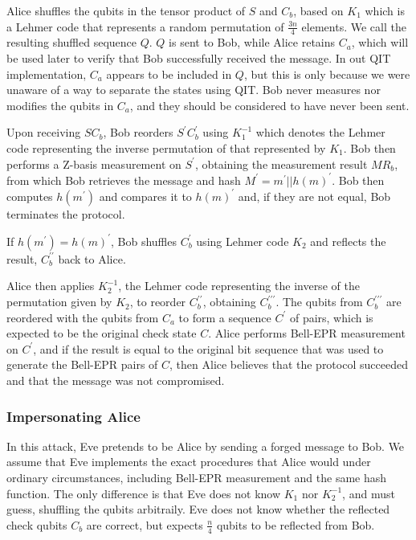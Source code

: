 \documentclass[conference]{IEEEtran}
\begin{document}
Alice shuffles the qubits in the tensor product of $S$ and $C_{b}$,
based on $K_{1}$ which is a {\LARGE\color{red}Lehmer code} that represents a random permutation of $\frac{3n}{4}$ elements.%
We call the resulting shuffled sequence $Q$. $Q$ is sent to Bob, while Alice retains $C_{a}$,
which will be used later to verify that Bob successfully received the message. In out QIT implementation,
$C_{a}$ appears to be included in $Q$, but this is only because we were unaware of a way to separate the states
using QIT. Bob never measures nor modifies the qubits in $C_{a}$, and they should be considered to have never been sent.

Upon receiving $SC_{b}$, Bob reorders $S^{\prime}C_{b}^{\prime}$
using $K_{1}^{-1}$ which denotes the Lehmer code representing the inverse permutation of that represented by $K_{1}$.
Bob then performs a Z-basis measurement on $S^{\prime}$,
obtaining the measurement result $MR_{b}$, from which Bob retrieves
the message and hash $M^{\prime}=m^{\prime}||h\left(m\right)^{\prime}$.
Bob then computes $h\left(m^{\prime}\right)$ and compares it to $h\left(m\right)^{\prime}$
and, if they are not equal, Bob terminates the protocol.

If $h\left(m^{\prime}\right)=h\left(m\right)^{\prime}$, Bob shuffles
$C_{b}^{\prime}$ using Lehmer code $K_{2}$ and reflects the result, $C_{b}^{\prime\prime}$
back to Alice.

Alice then applies $K_{2}^{-1}$, the Lehmer code representing the inverse
of the permutation given by $K_{2}$, to reorder $C_{b}^{\prime\prime}$, obtaining
$C_{b}^{\prime\prime\prime}$. The qubits from $C_{b}^{\prime\prime\prime}$ are reordered
with the qubits from $C_{a}$ to form a sequence $C^{\prime}$ of pairs, which is expected to be the
original check state $C$. Alice performs Bell-EPR measurement on $C^{\prime}$, and if the result
is equal to the original bit sequence that was used to generate the Bell-EPR pairs of $C$,
then Alice believes that the protocol succeeded and that the message was not compromised.

\subsubsection{Impersonating Alice}

In this attack, Eve pretends to be Alice by sending a forged message to Bob.
We assume that Eve implements the exact procedures that Alice
would under ordinary circumstances, including Bell-EPR
measurement and the same hash function. The only difference is that Eve
does not know $K_{1}$ nor $K_{2}^{-1}$, and must guess, shuffling the
qubits arbitraily. Eve does not know whether the reflected check qubits $C_{b}$
are correct, but expects $\frac{n}{4}$ qubits to be reflected from Bob.
\end{document}

